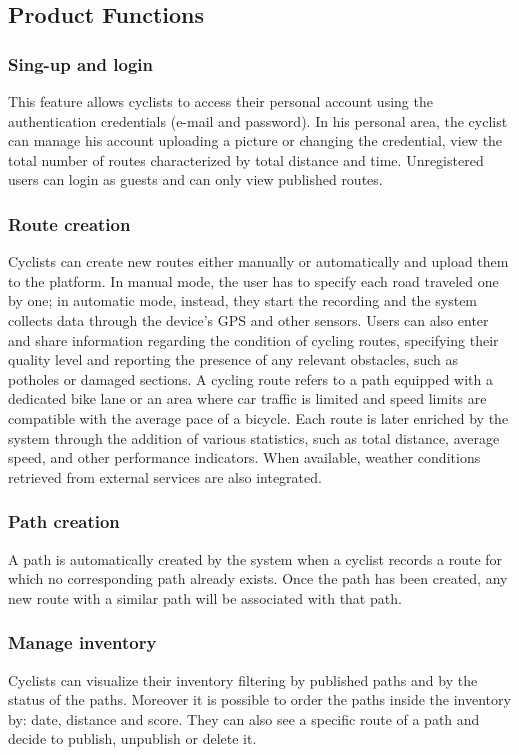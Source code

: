\subsection{Product Functions}
\subsubsection {Sing-up and login}
This feature allows cyclists to access  their personal account  using the authentication credentials (e-mail and password). In his personal area, the cyclist can manage his account uploading a picture or changing the credential, view the total number of routes characterized by total distance and time. Unregistered users can login as guests and can only view published routes.
\subsubsection {Route creation}
Cyclists can create new routes either manually or automatically and upload them to the platform.
In manual mode, the user has to specify each road traveled one by one; in automatic mode, instead, they start the recording and the system collects data through the device’s GPS and other sensors.
Users can also enter and share information regarding the condition of cycling routes, specifying their quality level and reporting the presence of any relevant obstacles, such as potholes or damaged sections.
A cycling route refers to a path equipped with a dedicated bike lane or an area where car traffic is limited and speed limits are compatible with the average pace of a bicycle.
Each route is later enriched by the system through the addition of various statistics, such as total distance, average speed, and other performance indicators.
When available, weather conditions retrieved from external services are also integrated.
\subsubsection {Path creation} 
A path is automatically created by the system when a cyclist records a route for which no corresponding path already exists. Once the path has been created, any new route with a similar path will be associated with that path.
\subsubsection{Manage inventory}
Cyclists can visualize their inventory filtering by published paths and by the status of the paths. Moreover it is possible to order the paths inside the inventory by: date, distance and score.
They can also see a specific route of a path and decide to publish, unpublish or delete it.
